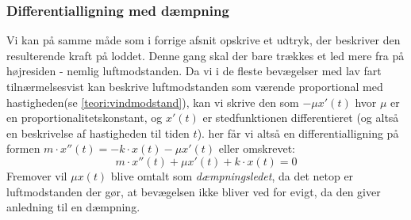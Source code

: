 \subsubsection{Differentialligning med dæmpning}\label{teori: Opstilling af ligning med dampning}
Vi kan på samme måde som i forrige afsnit opskrive et udtryk, der beskriver den resulterende kraft på loddet. 
Denne gang skal der bare trækkes et led mere fra på højresiden - nemlig luftmodstanden. 
Da vi i de fleste bevægelser med lav fart tilnærmelsesvist kan beskrive luftmodstanden som værende proportional med hastigheden\footnotemark(se \ref{teori:vindmodstand}), kan vi skrive den som $- \mu x'(t)$ hvor $\mu$ er en proportionalitetskonstant, og $x'(t)$ er stedfunktionen differentieret (og altså en beskrivelse af hastigheden til tiden $t$).
her får vi altså en differentialligning på formen $m\cdot x''(t)=-k\cdot x(t)-\mu x'(t)$ eller omskrevet:
$$m\cdot x''(t)+\mu x'(t)+k\cdot x(t)=0$$
Fremover vil $\mu x(t)$ blive omtalt som \textit{dæmpningsledet}, da det netop er luftmodstanden der gør, at bevægelsen ikke bliver ved for evigt, da den giver anledning til en dæmpning. 
